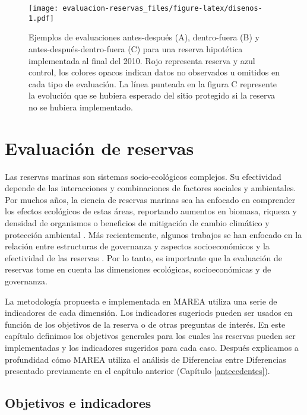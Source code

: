 \documentclass[]{krantz}
\begin{document}
\begin{figure}
\centering
\texttt{[image: evaluacion-reservas\_files/figure-latex/disenos-1.pdf]}
\caption{\label{fig:disenos}Ejemplos de evaluaciones antes-después (A),
dentro-fuera (B) y antes-después-dentro-fuera (C) para una reserva
hipotética implementada al final del 2010. Rojo representa reserva y
azul control, los colores opacos indican datos no observados u omitidos
en cada tipo de evaluación. La línea punteada en la figura C represente
la evolución que se hubiera esperado del sitio protegido si la reserva
no se hubiera implementado.}
\end{figure}

\hypertarget{evaluacion-de-reservas}{%
\chapter{Evaluación de reservas}\label{evaluacion-de-reservas}}

Las reservas marinas son sistemas socio-ecológicos complejos. Su
efectividad depende de las interacciones y combinaciones de factores
sociales y ambientales. Por muchos años, la ciencia de reservas marinas
sea ha enfocado en comprender los efectos ecológicos de estas áreas,
reportando aumentos en biomasa, riqueza y densidad de organismos o
beneficios de mitigación de cambio climático y protección ambiental
\citep{lester_2009, micheli_2012, giakoumi_2017, sala_2017, roberts_2017}.
Más recientemente, algunos trabajos se han enfocado en la relación entre
estructuras de governanza y aspectos socioeconómicos y la efectividad de
las reservas \citep{halpern_2013, lpezangarita_2014, mascia_2017}. Por
lo tanto, es importante que la evaluación de reservas tome en cuenta las
dimensiones ecológicas, socioeconómicas y de governanza.

La metodología propuesta e implementada en MAREA utiliza una serie de
indicadores de cada dimensión. Los indicadores sugeriods pueden ser
usados en función de los objetivos de la reserva o de otras preguntas de
interés. En este capítulo definimos los objetivos generales para los
cuales las reservas pueden ser implementadas y los indicadores sugeridos
para cada caso. Después explicamos a profundidad cómo MAREA utiliza el
análisis de Diferencias entre Diferencias presentado previamente en el
capítulo anterior (Capítulo \ref{antecedentes}).

\hypertarget{objetivos-e-indicadores}{%
\section{Objetivos e indicadores}\label{objetivos-e-indicadores}}
\end{document}
